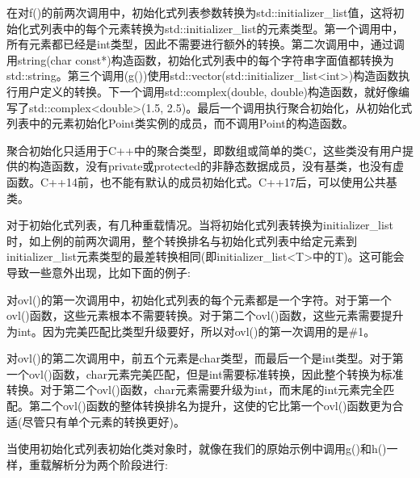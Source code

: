 在对f()的前两次调用中，初始化式列表参数转换为std::initializer\_list值，这将初始化式列表中的每个元素转换为std::initializer\_list的元素类型。第一个调用中，所有元素都已经是int类型，因此不需要进行额外的转换。第二次调用中，通过调用string(char const*)构造函数，初始化式列表中的每个字符串字面值都转换为std::string。第三个调用(g())使用std::vector(std::initializer\_list<int>)构造函数执行用户定义的转换。下一个调用std::complex(double, double)构造函数，就好像编写了std::complex<double>(1.5, 2.5)。最后一个调用执行聚合初始化，从初始化式列表中的元素初始化Point类实例的成员，而不调用Point的构造函数。

\begin{notice}聚合初始化只适用于C++中的聚合类型，即数组或简单的类C，这些类没有用户提供的构造函数，没有private或protected的非静态数据成员，没有基类，也没有虚函数。C++14前，也不能有默认的成员初始化式。C++17后，可以使用公共基类。
\end{notice}

对于初始化式列表，有几种重载情况。当将初始化式列表转换为initializer\_list时，如上例的前两次调用，整个转换排名与初始化式列表中给定元素到initializer\_list元素类型的最差转换相同(即initializer\_list<T>中的T)。这可能会导致一些意外出现，比如下面的例子:


对ovl()的第一次调用中，初始化式列表的每个元素都是一个字符。对于第一个ovl()函数，这些元素根本不需要转换。对于第二个ovl()函数，这些元素需要提升为int。因为完美匹配比类型升级要好，所以对ovl()的第一次调用的是\#1。

对ovl()的第二次调用中，前五个元素是char类型，而最后一个是int类型。对于第一个ovl()函数，char元素完美匹配，但是int需要标准转换，因此整个转换为标准转换。对于第二个ovl()函数，char元素需要升级为int，而末尾的int元素完全匹配。第二个ovl()函数的整体转换排名为提升，这使的它比第一个ovl()函数更为合适(尽管只有单个元素的转换更好)。

当使用初始化式列表初始化类对象时，就像在我们的原始示例中调用g()和h()一样，重载解析分为两个阶段进行:

